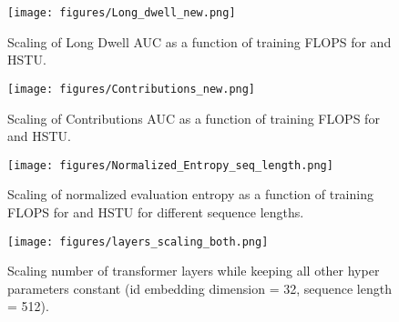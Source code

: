 \begin{figure}
    \centering
    \texttt{[image: figures/Long\_dwell\_new.png]}
    \caption{Scaling of Long Dwell AUC as a function of training FLOPS for {\systemname} and HSTU.\protect\footnotemark[\value{footnote}] }
    
    \label{fig:scaling-long-dwell}
    \centering
\end{figure}
\begin{figure}
    \centering
    \texttt{[image: figures/Contributions\_new.png]}
    \caption{Scaling of Contributions AUC as a function of training FLOPS for {\systemname} and HSTU.\protect\footnotemark[\value{footnote}]}
    \label{fig:scaling-contributions}
    \centering
\end{figure}

\begin{figure}
    \centering
    \texttt{[image: figures/Normalized\_Entropy\_seq\_length.png]}
    \caption{Scaling of normalized evaluation entropy as a function of training FLOPS for {\systemname} and HSTU for different sequence lengths.
    }
    \label{fig:ne-seq-length}
    \centering
\end{figure}


\begin{figure}
    \centering
    \texttt{[image: figures/layers\_scaling\_both.png]}
    \caption{Scaling number of transformer layers while keeping all other hyper parameters constant (id embedding dimension = 32, sequence length = 512).}
    \label{fig:scaling-layers}
    \centering
    \vspace{-1.0em}
\end{figure}

